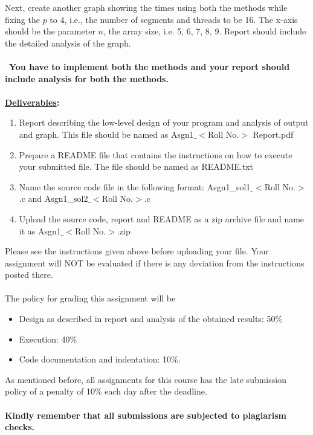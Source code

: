 \documentclass{article}
\begin{document}
Next, create another graph showing the times using both the methods while fixing the $p$ to 4, i.e., the number of segments and threads to be 16. The x-axis should be the parameter $n$, the array size,  i.e. 5, 6, 7, 8, 9. Report should include the detailed analysis of the graph.  \\\\\
\textbf{You have to implement both the methods and your report should include analysis for both the methods.}\\\\
\noindent\textbf{\underline {Deliverables}:}
\begin{enumerate}
    \item Report describing the low-level design of your program and analysis of output and graph. This file should be named as Asgn1$\_<$Roll No.$>$ Report.pdf
    \item Prepare a README file that contains the instructions on how to execute your submitted file. The file should be named as README.txt
    \item Name the source code file in the following format: Asgn1\_sol1$\_<$Roll No.$>$.c and Asgn1\_sol2$\_<$Roll No.$>$.c
    \item Upload the source code, report and README as a zip archive file and name it as Asgn1$\_<$Roll No.$>$.zip
    
\end{enumerate}
Please see the instructions given above before uploading your file. Your assignment will NOT be evaluated if there is any deviation from the instructions posted there.\\
\\
The policy for grading this assignment will be 
\begin{itemize}
    \item Design as described in report and analysis of the obtained results: 50\%
    \item Execution: 40\%
    \item Code documentation and indentation: 10\%.
\end{itemize}
As mentioned before, all assignments for this course has the late submission policy of a penalty of 10\% each day after the deadline.\\\\
\textbf{Kindly remember that all submissions are subjected to plagiarism checks.}
\end{document}
